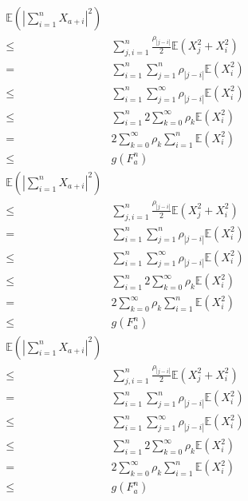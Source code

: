 \documentclass{ctexart}
\begin{document}
\begin{remark}
\begin{equation}
    \begin{aligned}
      \mathbb{E}(|\sum_{i=1}^{n}X_{a+i}|^2) \\
      \leq & \sum_{j,i = 1}^{n} \frac{\rho_{|j-i|}}{2}\mathbb{E}(X_j^2 + X_i^2)\\
      =& \sum_{i=1}^{n} \sum_{j=1}^{n}\rho_{|j-i|}\mathbb{E}(X_i^2)\\
      \leq & \sum_{i=1}^{n} \sum_{j=1}^{\infty} \rho_{|j-i|}\mathbb{E}(X_i^2)\\
      \leq & \sum_{i=1}^{n} 2\sum_{k=0}^{\infty} \rho_k \mathbb{E}(X_i^2)\\
      =& 2\sum_{k=0}^{\infty}\rho_k  \sum_{i=1}^{n}\mathbb{E}(X_i^2)\\
      \leq & g(F_a^n)
    \end{aligned}
  \end{equation}
  \begin{equation}
    \begin{aligned}
      \mathbb{E}(|\sum_{i=1}^{n}X_{a+i}|^2) \\
      \leq & \sum_{j,i = 1}^{n} \frac{\rho_{|j-i|}}{2}\mathbb{E}(X_j^2 + X_i^2)\\
      =& \sum_{i=1}^{n} \sum_{j=1}^{n}\rho_{|j-i|}\mathbb{E}(X_i^2)\\
      \leq & \sum_{i=1}^{n} \sum_{j=1}^{\infty} \rho_{|j-i|}\mathbb{E}(X_i^2)\\
      \leq & \sum_{i=1}^{n} 2\sum_{k=0}^{\infty} \rho_k \mathbb{E}(X_i^2)\\
      =& 2\sum_{k=0}^{\infty}\rho_k  \sum_{i=1}^{n}\mathbb{E}(X_i^2)\\
      \leq & g(F_a^n)
    \end{aligned}
  \end{equation}
  \begin{equation}
    \begin{aligned}
      \mathbb{E}(|\sum_{i=1}^{n}X_{a+i}|^2) \\
      \leq & \sum_{j,i = 1}^{n} \frac{\rho_{|j-i|}}{2}\mathbb{E}(X_j^2 + X_i^2)\\
      =& \sum_{i=1}^{n} \sum_{j=1}^{n}\rho_{|j-i|}\mathbb{E}(X_i^2)\\
      \leq & \sum_{i=1}^{n} \sum_{j=1}^{\infty} \rho_{|j-i|}\mathbb{E}(X_i^2)\\
      \leq & \sum_{i=1}^{n} 2\sum_{k=0}^{\infty} \rho_k \mathbb{E}(X_i^2)\\
      =& 2\sum_{k=0}^{\infty}\rho_k  \sum_{i=1}^{n}\mathbb{E}(X_i^2)\\
      \leq & g(F_a^n)
    \end{aligned}

\end{equation}
\end{remark}
\end{document}
